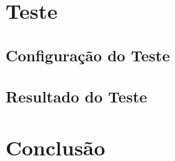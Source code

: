 \documentclass[
	12pt,				%
	openright,			%
	twoside,			%
	a4paper,			%
	english,			%
	brazil				%
	]{abntex2}
\begin{document}
\chapter{Teste}

	\section{Configuração do Teste}

	\section{Resultado do Teste}
\chapter{Conclusão}

\lipsum[31-33]

\postextual


\end{document}
